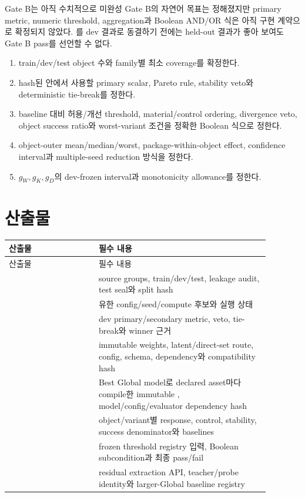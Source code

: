\documentclass[10pt,a4paper]{article}
\begin{document}
\begin{decisionbox}{Gate B는 아직 수치적으로 미완성}
Gate B의 자연어 목표는 정해졌지만 primary metric, numeric threshold, aggregation과 Boolean AND/OR 식은
아직 구현 계약으로 확정되지 않았다. 를 dev 결과로 동결하기 전에는
held-out 결과가 좋아 보여도 Gate B pass를 선언할 수 없다.
\end{decisionbox}

\begin{enumerate}
  \item {} train/dev/test object 수와 family별 최소 coverage를 확정한다.
  \item {} hash된  안에서 사용할 primary scalar,
  Pareto rule, stability veto와 deterministic tie-break를 정한다.
  \item {} baseline 대비 허용/개선 threshold, material/control ordering,
  divergence veto, object success ratio와 worst-variant 조건을 정확한 Boolean 식으로 정한다.
  \item {} object-outer mean/median/worst, package-within-object effect,
  confidence interval과 multiple-seed reduction 방식을 정한다.
  \item {} \(g_W,g_K,g_D\)의 dev-frozen interval과 monotonicity allowance를 정한다.
\end{enumerate}

\section{산출물}
\label{sec:r4-chapter-6}

\begin{longtable}{L{0.30\linewidth}L{0.58\linewidth}}
\toprule
산출물 & 필수 내용\\
\midrule
\endfirsthead
\toprule
산출물 & 필수 내용\\
\midrule
\endhead
{} & source groups, train/dev/test, leakage audit, test seal와 split hash\\
 & 유한 config/seed/compute 후보와 실행 상태\\
 & dev primary/secondary metric, veto, tie-break와 winner 근거\\
 & immutable weights, latent/direct-set route, config, schema, dependency와 compatibility hash\\
 & Best Global model로 declared asset마다 compile한 immutable , model/config/evaluator dependency hash\\
 & object/variant별 response, control, stability, success denominator와 baselines\\
 & frozen threshold registry 입력, Boolean subcondition과 최종 pass/fail\\
 & residual extraction API, teacher/probe identity와 larger-Global baseline registry\\
\bottomrule
\end{longtable}
\end{document}
